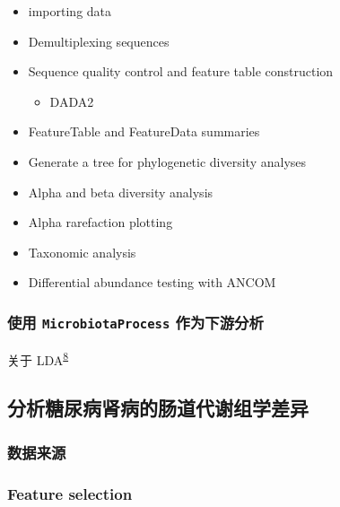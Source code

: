 \documentclass[
]{article}
\providecommand{\tightlist}{%
  \setlength{\itemsep}{0pt}\setlength{\parskip}{0pt}}
\begin{document}
\begin{itemize}
\tightlist
\item
  importing data
\item
  Demultiplexing sequences
\item
  Sequence quality control and feature table construction

  \begin{itemize}
  \tightlist
  \item
    DADA2
  \end{itemize}
\item
  FeatureTable and FeatureData summaries
\item
  Generate a tree for phylogenetic diversity analyses
\item
  Alpha and beta diversity analysis
\item
  Alpha rarefaction plotting
\item
  Taxonomic analysis
\item
  Differential abundance testing with ANCOM
\end{itemize}

\hypertarget{ux4f7fux7528-microbiotaprocess-ux4f5cux4e3aux4e0bux6e38ux5206ux6790}{%
\subsubsection{\texorpdfstring{使用 \texttt{MicrobiotaProcess} 作为下游分析}{使用 MicrobiotaProcess 作为下游分析}}\label{ux4f7fux7528-microbiotaprocess-ux4f5cux4e3aux4e0bux6e38ux5206ux6790}}

关于 LDA\textsuperscript{\protect\hyperlink{ref-MicrobiomeDataRaiS2021}{8}}

\hypertarget{ux5206ux6790ux7cd6ux5c3fux75c5ux80beux75c5ux7684ux80a0ux9053ux4ee3ux8c22ux7ec4ux5b66ux5deeux5f02}{%
\subsection{分析糖尿病肾病的肠道代谢组学差异}\label{ux5206ux6790ux7cd6ux5c3fux75c5ux80beux75c5ux7684ux80a0ux9053ux4ee3ux8c22ux7ec4ux5b66ux5deeux5f02}}

\hypertarget{ux6570ux636eux6765ux6e90}{%
\subsubsection{数据来源}\label{ux6570ux636eux6765ux6e90}}

\hypertarget{feature-selection}{%
\subsubsection{Feature selection}\label{feature-selection}}
\end{document}
